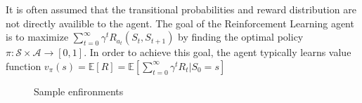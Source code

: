 \documentclass[a0]{a0poster}
\begin{document}
\begin{textblock}{7.0}
It is often assumed that the transitional probabilities and reward distribution
are not directly availible to the agent. The goal of the Reinforcement Learning
agent is to maximize $\sum_{t=0}^{\infty} \gamma^t R_{a_{t}}(S_{t}, S_{t + 1})$
by finding the optimal policy $\pi: \mathcal{S} \times \mathcal{A} \rightarrow
[0, 1]$. In order to achieve this goal, the agent typically learns value
function $v_\pi(s) = \mathbb{E}[R] = {\mathbb{E}}[\sum_{t=0}^\infty \gamma^t R_t | S_0 = s]$

\begin{center}
\begin{figure}%
    \centering
    \qquad
    \caption{Sample enfironments}%
    \label{fig:example}%
\end{figure}
\end{center}

\end{textblock}
\end{document}
